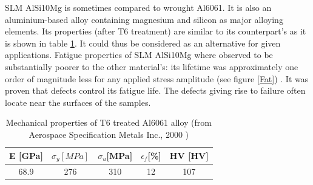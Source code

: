  \begin{center}
\begin{table}[ht]
\noindent{}
\caption[Mechanical properties for different plate pre heating temperatures (from Wang et al., 2018) \parencite{Wang2018}.]{Mechanical properties for different plate pre heating temperatures (from Wang et al., 2018) \parencite{Wang2018}.}
\label{tab:Wang}
\end{table}
 \end{center}

SLM AlSi10Mg is sometimes compared to wrought Al6061. It is also an aluminium-based alloy containing magnesium and silicon as major alloying elements. Its properties (after T6 treatment) are similar to its counterpart's as it is shown in table \ref{tab:6061}. It could thus be considered as an alternative for given applications. Fatigue properties of SLM AlSi10Mg where observed to be substantially poorer to the other material's: its lifetime was approximately one order of magnitude less for any applied stress amplitude (see figure \ref{Fat}) \parencite{MOWER2016198}. It was proven that defects control its fatigue life. The defects giving rise to failure often locate near the surfaces of the samples. %
\\

 \begin{center}
\begin{table}[ht]
\centering
\begin{tabular}{|c|c|c|c|c|}
    \hline
    E [GPa] &$\sigma_y [MPa]$ &$\sigma_u$[MPa]&$\epsilon_f$[\%]&HV [HV] \\
\hline
\hline   
    68.9 &276  & 310 &12 &107	\\
    \hline

\end{tabular}
\caption[Mechanical properties of T6 treated Al6061 alloy]{Mechanical properties of T6 treated Al6061 alloy (from Aerospace Specification Metals Inc., 2000 \parencite{6061}) }
\label{tab:6061}
\end{table}
 \end{center}
 
